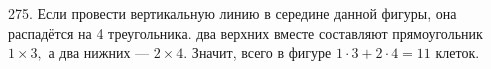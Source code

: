 275. Если провести вертикальную линию в середине данной фигуры, она распадётся на 4 треугольника. два верхних вместе составляют прямоугольник $1\times3,$ а два нижних --- $2\times4.$ Значит, всего в фигуре $1\cdot3+2\cdot4=11$ клеток.\\
